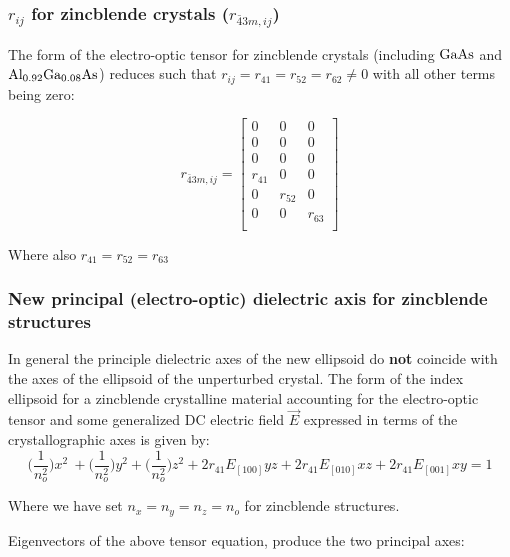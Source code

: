 
\subsubsection{\texorpdfstring{$r_{ij}$}{rij} for zincblende crystals (\texorpdfstring{$r_{\bar{4}3m, ij}$}{r43})}

The form of the electro-optic tensor for zincblende crystals (including $\mathrm{GaAs}$ and $\mathrm{Al_{0.92}Ga_{0.08}As}$) reduces such that $r_{ij} = r_{41} = r_{52} = r_{62} \neq 0$ with all other terms being zero:

\begin{equation}
r_{\bar{4}3m,ij} =
 \left[ {\begin{array}{ccc}
  0 & 0 & 0\\
  0 & 0 & 0\\
  0 & 0 & 0\\
  r_{41} & 0 & 0\\
  0 & r_{52} & 0\\
  0 & 0 & r_{63}\\
 \end{array}} \right]
\end{equation}

\noindent Where also $r_{41} = r_{52} = r_{63}$

\subsubsection{New principal (electro-optic) dielectric axis for zincblende structures}
In general the principle dielectric axes of the new ellipsoid do \textbf{not} coincide with the axes of the ellipsoid of the unperturbed crystal. The form of the index ellipsoid for a zincblende crystalline material accounting for the electro-optic tensor and some generalized DC electric field $\vec{E}$ expressed in terms of the crystallographic axes is given by:
\begin{equation}\label{eq:zindicatrix}
\bigg(\frac{1}{n_o^2} \bigg) x^2\ + \bigg(\frac{1}{n_o^2} \bigg) y^2 + \bigg(\frac{1}{n_o^2} \bigg) z^2  + 2r_{41} E_{[100]} yz + 2r_{41} E_{[010]} xz + 2r_{41}E_{[001]} xy= 1
\end{equation}

\noindent Where we have set $n_x = n_y = n_z = n_o$ for zincblende structures.

\noindent Eigenvectors of the above tensor equation, produce the two principal axes:	

